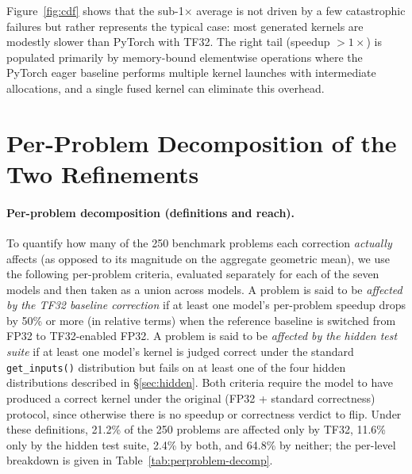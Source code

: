 \documentclass[]{fairmeta}
\begin{document}
Figure~\ref{fig:cdf} shows that the sub-1$\times$ average is not driven by a few catastrophic failures but rather represents the typical case: most generated kernels are modestly slower than PyTorch with TF32. The right tail (speedup $>1\times$) is populated primarily by memory-bound elementwise operations where the PyTorch eager baseline performs multiple kernel launches with intermediate allocations, and a single fused kernel can eliminate this overhead.

\section{Per-Problem Decomposition of the Two Refinements}
\label{app:perproblem-decomp}

\paragraph{Per-problem decomposition (definitions and reach).} To quantify how many of the 250 benchmark problems each correction \emph{actually} affects (as opposed to its magnitude on the aggregate geometric mean), we use the following per-problem criteria, evaluated separately for each of the seven models and then taken as a union across models. A problem is said to be \emph{affected by the TF32 baseline correction} if at least one model's per-problem speedup drops by 50\% or more (in relative terms) when the reference baseline is switched from FP32 to TF32-enabled FP32. A problem is said to be \emph{affected by the hidden test suite} if at least one model's kernel is judged correct under the standard \texttt{get\_inputs()} distribution but fails on at least one of the four hidden distributions described in \S\ref{sec:hidden}. Both criteria require the model to have produced a correct kernel under the original (FP32 + standard correctness) protocol, since otherwise there is no speedup or correctness verdict to flip. Under these definitions, 21.2\% of the 250 problems are affected only by TF32, 11.6\% only by the hidden test suite, 2.4\% by both, and 64.8\% by neither; the per-level breakdown is given in Table~\ref{tab:perproblem-decomp}.
\end{document}
